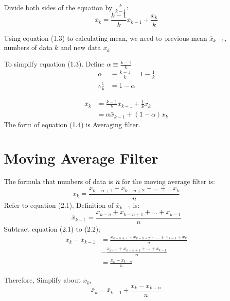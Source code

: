 \documentclass{article}
\numberwithin{equation}{section} %
\begin{document}
Divide both sides of the equation by \(\frac{k}{k-1}\):
\begin{equation*}
    \bar{x}_k = \frac{k-1}{k} \bar{x}_{k-1} + \frac{x_k}{k}
\end{equation*}

Using equation (1.3) to calculating mean, we need to previous mean \(\bar{x}_{k-1}\), numbers of data \(k\) and new data \(x_k\)

To simplify equation (1.3).
Define \(\alpha \equiv \frac{k-1}{k}\)
\begin{align*}
    \alpha                & \equiv \frac{k - 1}{k} = 1 - \frac{1}{k} \\
    \therefore\frac{1}{k} & = 1 - \alpha
\end{align*}

\begin{align}
    \bar{x}_k & = \frac{k - 1}{k}\bar{x}_{k-1} + \frac{1}{k}x_k \nonumber \\
              & = \alpha \bar{x}_{k-1} + (1 - \alpha) x_k
\end{align}
The form of equation (1.4) is Averaging filter.

\section{Moving Average Filter}
The formula that numbers of data is \textit{\textbf{n}} for the moving average filter is:
\begin{equation}
    \bar{x}_k = \frac{x_{k-n+1} + x_{k-n+2} + \ldots + ...x_k}{n}
\end{equation}
Refer to equation (2.1), Definition of \(\bar{x}_{k-1}\) is:
\begin{equation}
    \bar{x}_{k-1} = \frac{x_{k-n}+x_{k-n+1}+\ldots+x_{k-1}}{n}
\end{equation}
Subtract equation (2.1) to (2.2);
\begin{align*}
    \bar{x}_k - \bar{x}_{k-1} & = \frac{x_{k-n+1}+x_{k-n+2}+\ldots+x_{k-1}+x_k}{n} \\
                              & - \frac{x_{k-n}+x_{k-n+1}+\ldots+x_{k-1}}{n}       \\
                              & = \frac{x_k - x_{k-n}}{n}
\end{align*}

Therefore, Simplify about \(\bar{x}_k\),
\begin{equation}
    \bar{x}_k = \bar{x}_{k-1} + \frac{x_k - x_{k-n}}{n}
\end{equation}
\end{document}
